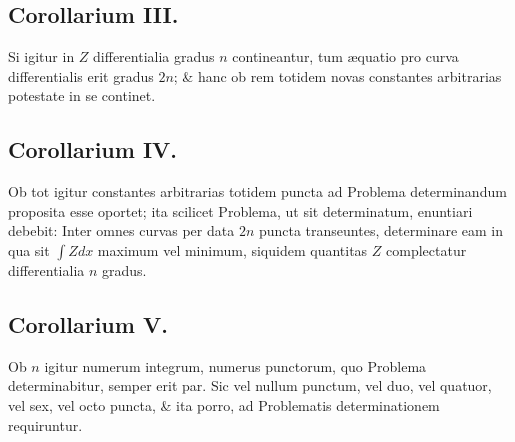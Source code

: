 \subsection*{Corollarium III.}
Si igitur in $Z$ differentialia gradus $n$ contineantur, tum æquatio pro curva differentialis erit gradus $2n$; \& hanc ob rem totidem novas constantes arbitrarias potestate in se continet.

\subsection*{Corollarium IV.}
Ob tot igitur constantes arbitrarias totidem puncta ad Problema determinandum proposita esse oportet; ita scilicet Problema, ut sit determinatum, enuntiari debebit: Inter omnes curvas per data $2n$ puncta transeuntes, determinare eam in qua sit $\int Zdx$ maximum vel minimum, siquidem quantitas $Z$ complectatur differentialia $n$ gradus.

\subsection*{Corollarium V.}
Ob $n$ igitur numerum integrum, numerus punctorum, quo Problema determinabitur, semper erit par. Sic vel nullum punctum, vel duo, vel quatuor, vel sex, vel octo puncta, \& ita porro, ad Problematis determinationem requiruntur.

